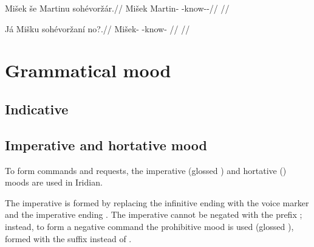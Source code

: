\pex
\begingl
\gla Mišek še Martinu sohévoržár.//
\glb Mišek \Com{} Martin-\Ins{} \Rec{}-know-\Av{}-\Prog{}//
\glft {}//
\endgl
\xe

\pex
\begingl
\gla Já Mišku sohévoržaní no?.//
\glb {} Mišek-\Ins{} \Rec{}-know- //
\glft {}//
\endgl
\xe



\section{Grammatical mood}

\subsection{Indicative}

\subsection{Imperative and hortative mood}\label{sec:imp-hort}

To form commands and requests, the imperative (glossed ) and hortative () moods are used in Iridian.

The imperative is formed by replacing the infinitive ending  with the voice marker and the imperative ending . The imperative cannot be negated with the prefix ; instead, to form a negative command the prohibitive mood is used (glossed ), formed with the suffix  instead of .

